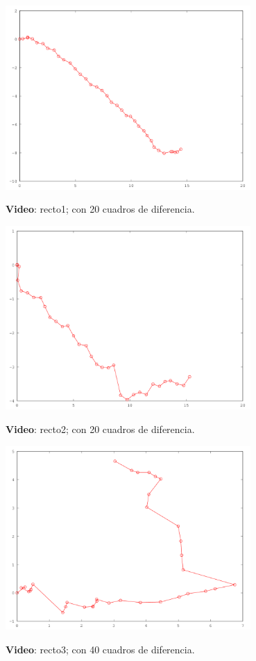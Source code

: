 \documentclass[10pt, a4paper,english,spanish,hidelinks]{article}
\begin{document}
\centerline{ }
\centerline{\includegraphics[width=0.7\textwidth]{./img/recto1.png}}
\centerline{\textbf{Video}: recto1; con 20 cuadros de diferencia.} 

\centerline{ }
\centerline{\includegraphics[width=0.7\textwidth]{./img/recto2.png}}
\centerline{\textbf{Video}: recto2; con 20 cuadros de diferencia.} 

\centerline{ }
\centerline{\includegraphics[width=0.7\textwidth]{./img/recto3.png}}
\centerline{\textbf{Video}: recto3; con 40 cuadros de diferencia.}
\end{document}
